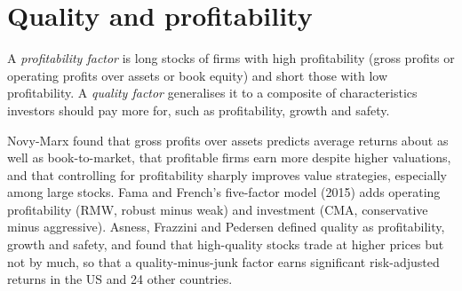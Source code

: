 \begin{omfigure}

\label{fig:s1:value-quality-and-low-risk:rolling}
\end{omfigure}

\section{Quality and profitability}

\begin{definition}\label{def:s1:value-quality-and-low-risk:quality}
A \emph{profitability factor} is long stocks of firms with high profitability (gross profits or operating profits over assets or
book equity) and short those with low profitability. A \emph{quality factor} generalises it to a composite of characteristics investors
should pay more for, such as profitability, growth and safety.
\end{definition}

Novy-Marx found that gross profits over assets predicts average returns about as well as book-to-market, that profitable firms earn more despite higher
valuations, and that controlling for profitability sharply improves value strategies, especially among large stocks. Fama and French's five-factor model
(2015) adds operating profitability (RMW, robust minus weak) and investment (CMA, conservative minus aggressive). Asness, Frazzini and Pedersen defined
quality as profitability, growth and safety, and found that high-quality stocks trade at higher prices but not by much, so that a quality-minus-junk factor
earns significant risk-adjusted returns in the US and 24 other countries.

